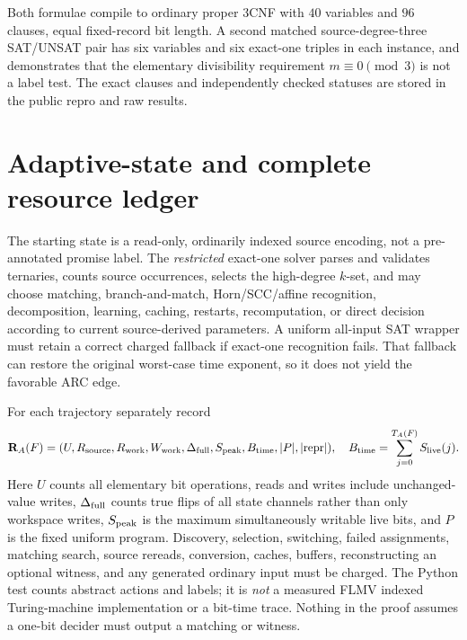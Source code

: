 \documentclass[11pt]{article}
\begin{document}
Both formulae compile to ordinary proper 3CNF with \(40\) variables and \(96\) clauses, equal fixed-record bit length. A second matched source-degree-three SAT/UNSAT pair has six variables and six exact-one triples in each instance, and demonstrates that the elementary divisibility requirement \(m\equiv0\pmod 3\) is not a label test. The exact clauses and independently checked statuses are stored in the public repro and raw results.

\section{Adaptive-state and complete resource ledger}
The starting state is a read-only, ordinarily indexed source encoding, not a pre-annotated promise label. The \emph{restricted} exact-one solver parses and validates ternaries, counts source occurrences, selects the high-degree \(k\)-set, and may choose matching, branch-and-match, Horn/SCC/affine recognition, decomposition, learning, caching, restarts, recomputation, or direct decision according to current source-derived parameters. A uniform all-input SAT wrapper must retain a correct charged fallback if exact-one recognition fails. That fallback can restore the original worst-case time exponent, so it does not yield the favorable ARC edge.

For each trajectory separately record
\[
 {\bf R}_A(F)=
 (U,R_{\rm source},R_{\rm work},W_{\rm work},
 \Delta_{\rm full},S_{\rm peak},B_{\rm time},
 |P|,|{\rm repr}|),
 \quad B_{\rm time}=\sum_{j=0}^{T_A(F)}S_{\rm live}(j).
\]
Here \(U\) counts all elementary bit operations, reads and writes include unchanged-value writes, \(\Delta_{\rm full}\) counts true flips of all state channels rather than only workspace writes, \(S_{\rm peak}\) is the maximum simultaneously writable live bits, and \(P\) is the fixed uniform program. Discovery, selection, switching, failed assignments, matching search, source rereads, conversion, caches, buffers, reconstructing an optional witness, and any generated ordinary input must be charged. The Python test counts abstract actions and labels; it is \emph{not} a measured FLMV indexed Turing-machine implementation or a bit-time trace. Nothing in the proof assumes a one-bit decider must output a matching or witness.
\end{document}
